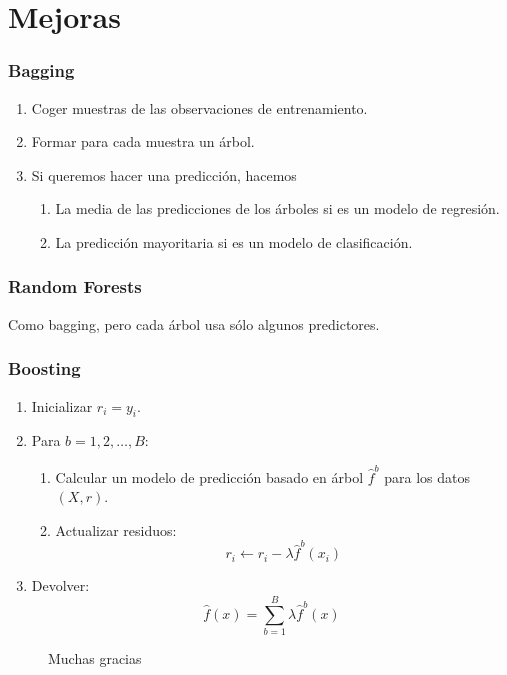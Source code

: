 \documentclass{beamer}
\theoremstyle{definition}
\begin{document}
\section{Mejoras}
\begin{frame}
\frametitle{Bagging}
\begin{enumerate}
	\item<1-> Coger muestras de las observaciones de entrenamiento.
	\item<2-> Formar para cada muestra un árbol.
	\item<3-> Si queremos hacer una predicción, hacemos 
	\begin{enumerate}
		\item La media de las predicciones de los árboles si es un modelo de regresión.
		\item La predicción mayoritaria si es un modelo de clasificación.
	\end{enumerate}
\end{enumerate}
\end{frame}

\begin{frame}
\frametitle{Random Forests}
Como bagging, pero cada árbol usa sólo algunos predictores.
\end{frame}

\begin{frame}
\frametitle{Boosting}
\begin{enumerate}
	\item<1-> Inicializar $r_i = y_i$.
	\item<2-> Para $b=1,2,\dots,B$:
	\begin{enumerate}
		\item Calcular un modelo de predicción basado en árbol $\widehat{f}^b$ para los datos $(X,r)$.
		\item Actualizar residuos:
		\[ r_i \leftarrow r_i - \lambda \widehat{f}^b(x_i) \]
	\end{enumerate}
	\item<3-> Devolver:
	\[ \widehat{f}(x) = \sum_{b=1}^B \lambda \widehat{f}^b(x) \]
\end{enumerate}
\end{frame}



\begin{frame}
\begin{figure}[h!]
Muchas gracias
\end{figure}
\end{frame}
\end{document}
